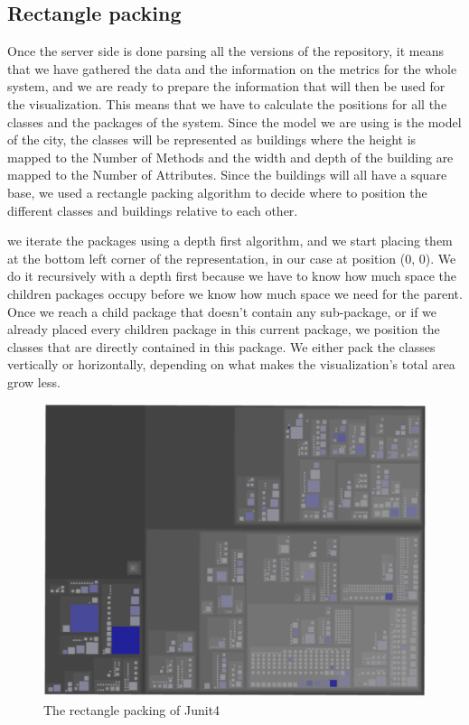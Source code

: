 \documentclass[]{usiinfbachelorproject}
\begin{document}
\subsection{Rectangle packing} \label{Rectangle packing}
Once the server side is done parsing all the versions of the repository, it means that we have gathered the data and the information on the metrics for the whole system, and we are ready to prepare the information that will then be used for the visualization. This means that we have to calculate the positions for all the classes and the packages of the system. Since the model we are using is the model of the city, the classes will be represented as buildings where the height is mapped to the Number of Methods and the width and depth of the building are mapped to the Number of Attributes. Since the buildings will all have a square base, we used a rectangle packing algorithm to decide where to position the different classes and buildings relative to each other.

we iterate the packages using a depth first algorithm, and we start placing them at the bottom left corner of the representation, in our case at position (0, 0). We do it recursively with a depth first because we have to know how much space the children packages occupy before we know how much space we need for the parent.
Once we reach a child package that doesn't contain any sub-package, or if we already placed every children package in this current package, we position the classes that are directly contained in this package. We either pack the classes vertically or horizontally, depending on what makes the visualization's total area grow less.

\begin{figure} [H]
\centering
\includegraphics[width=.7\textwidth]{pictures/junit4Above.png}
\caption{The rectangle packing of Junit4}
\label{fig:rectanglePacking}
\end{figure}
\end{document}
